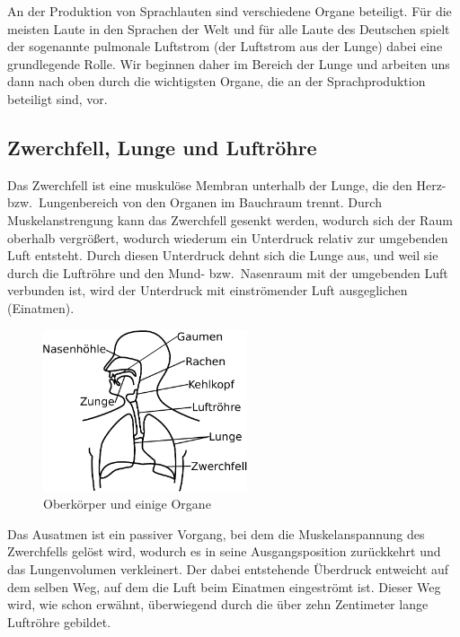 An der Produktion von Sprachlauten sind verschiedene Organe beteiligt.
Für die meisten Laute in den Sprachen der Welt und für alle Laute des Deutschen spielt der sogenannte pulmonale Luftstrom (der Luftstrom aus der Lunge) dabei eine grundlegende Rolle.
Wir beginnen daher im Bereich der Lunge und arbeiten uns dann nach oben durch die wichtigsten Organe, die an der Sprachproduktion beteiligt sind, vor.

\subsection{Zwerchfell, Lunge und Luftröhre}

Das Zwerchfell ist eine muskulöse Membran unterhalb der Lunge, die den Herz- bzw.\ Lungenbereich von den Organen im Bauchraum trennt.
Durch Muskelanstrengung kann das Zwerchfell gesenkt werden, wodurch sich der Raum oberhalb vergrößert, wodurch wiederum ein Unterdruck relativ zur umgebenden Luft entsteht.
Durch diesen Unterdruck dehnt sich die Lunge aus, und weil sie durch die Luftröhre und den Mund- bzw.\ Nasenraum mit der umgebenden Luft verbunden ist, wird der Unterdruck mit einströmender Luft ausgeglichen (Einatmen).

\begin{figure}[!h]
  \centering
  \includegraphics[width=6cm]{figures/ueberblick}
  \caption{Oberkörper und einige Organe}
  \label{fig:lunge}
\end{figure}

Das Ausatmen ist ein passiver Vorgang, bei dem die Muskelanspannung des Zwerchfells gelöst wird, wodurch es in seine Ausgangsposition zurückkehrt und das Lungenvolumen verkleinert.
Der dabei entstehende Überdruck entweicht auf dem selben Weg, auf dem die Luft beim Einatmen eingeströmt ist.
Dieser Weg wird, wie schon erwähnt, überwiegend durch die über zehn Zentimeter lange Luftröhre gebildet.


